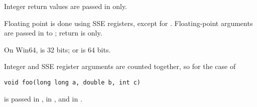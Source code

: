 Integer return values are passed in  only.

Floating point is done using SSE registers, except for . Floating-point arguments are passed in 
to ; return is  only.

On Win64,  is 32 bits;  or 
is 64 bits.

Integer and SSE register arguments are counted together, so
for the case of

\begin{lstlisting}
void foo(long long a, double b, int c)
\end{lstlisting}

 is passed in ,  in ,
and  in .

